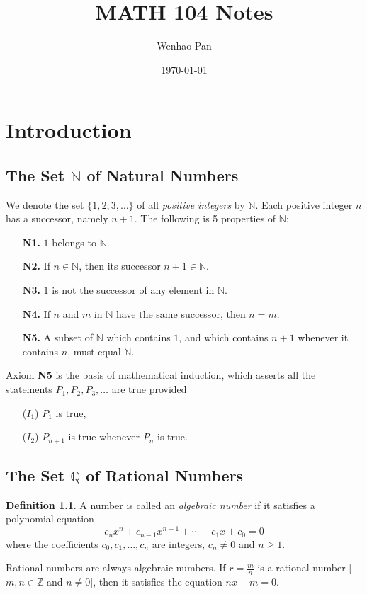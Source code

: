 \documentclass[12pt, lettersize]{book}
\title{MATH 104 Notes}
\author{Wenhao Pan}
\date{\today}
\theoremstyle{plain}
\theoremstyle{definition}
\newtheorem{dfn}[thm]{Definition}
\theoremstyle{remark}
\newcommand{\N}{\mathbb{N}}
\newcommand{\Q}{\mathbb{Q}}
\newcommand{\Z}{\mathbb{Z}}
\begin{document}
	\maketitle
	\tableofcontents
	
	\chapter{Introduction}
	\newpage
	\section{The Set $\N$ of Natural Numbers}
		We denote the set $\{1,2,3,\dots\}$ of all \emph{positive integers} by $\N$. Each positive integer $n$ has a successor, namely $n+1$. The following is 5 properties of $\N$:
		\begin{itemize}
			\item[\textbf{N1.}] $1$ belongs to $\N$.
			\item[\textbf{N2.}] If $n\in\N$, then its successor $n+1\in\N$.
			\item[\textbf{N3.}] $1$ is not the successor of any element in $\N$.
			\item[\textbf{N4.}] If $n$ and $m$ in $\N$ have the same successor, then $n=m$.
			\item[\textbf{N5.}] A subset of $\N$ which contains $1$, and which contains $n+1$ whenever it contains $n$, must equal $\N$.
		\end{itemize}
		Axiom \textbf{N5} is the basis of mathematical induction, which asserts all the statements $P_1,P_2,P_3,\dots$ are true provided
		\begin{itemize}
			\item[(\textbf{$I_1$})] $P_1$ is true,
			\item[(\textbf{$I_2$})] $P_{n+1}$ is true whenever $P_n$ is true.
		\end{itemize}
		\newpage
	\section{The Set $\Q$ of Rational Numbers}
		\begin{dfn}
		A number is called an \emph{algebraic number} if it satisfies a polynomial equation
		\begin{displaymath}
			c_nx^n+c_{n-1}x^{n-1}+\cdots+c_1x+c_0=0
		\end{displaymath}
		where the coefficients $c_0,c_1,\dots,c_n$ are integers, $c_n\neq0$ and $n\geq1$.
		\end{dfn}
		Rational numbers are always algebraic numbers. If $r=\frac{m}{n}$ is a rational number [$m,n\in\Z$ and $n\neq0$], then it satisfies the equation $nx-m=0$.
		
\end{document}
